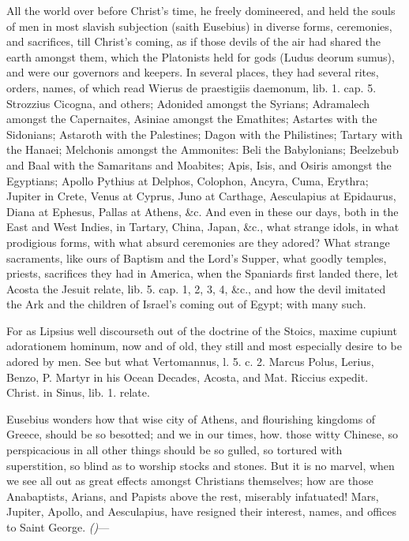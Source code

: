 {All the world over before Christ's time, he freely domineered, and held
the souls of men in most slavish subjection (saith Eusebius) in
diverse forms, ceremonies, and sacrifices, till Christ's coming, as if
those devils of the air had shared the earth amongst them, which the
Platonists held for gods (Ludus deorum sumus), and were our
governors and keepers. In several places, they had several rites,
orders, names, of which read Wierus de praestigiis daemonum, lib. 1.
cap. 5. Strozzius Cicogna, and others; Adonided amongst the
Syrians; Adramalech amongst the Capernaites, Asiniae amongst the
Emathites; Astartes with the Sidonians; Astaroth with the Palestines;
Dagon with the Philistines; Tartary with the Hanaei; Melchonis amongst
the Ammonites: Beli the Babylonians; Beelzebub and Baal with the
Samaritans and Moabites; Apis, Isis, and Osiris amongst the Egyptians;
Apollo Pythius at Delphos, Colophon, Ancyra, Cuma, Erythra; Jupiter in
Crete, Venus at Cyprus, Juno at Carthage, Aesculapius at Epidaurus,
Diana at Ephesus, Pallas at Athens, \&c. And even in these our days,
both in the East and West Indies, in Tartary, China, Japan, \&c., what
strange idols, in what prodigious forms, with what absurd ceremonies
are they adored? What strange sacraments, like ours of Baptism and the
Lord's Supper, what goodly temples, priests, sacrifices they had in
America, when the Spaniards first landed there, let Acosta the Jesuit
relate, lib. 5. cap. 1, 2, 3, 4, \&c., and how the devil imitated the
Ark and the children of Israel's coming out of Egypt; with many such.

For as Lipsius well discourseth out of the doctrine of the Stoics,
maxime cupiunt adorationem hominum, now and of old, they still and most
especially desire to be adored by men. See but what Vertomannus, l. 5.
c. 2. Marcus Polus, Lerius, Benzo, P. Martyr in his Ocean Decades,
Acosta, and Mat. Riccius expedit. Christ. in Sinus, lib. 1. relate.

Eusebius wonders how that wise city of Athens, and flourishing
kingdoms of Greece, should be so besotted; and we in our times, how.
those witty Chinese, so perspicacious in all other things should be so
gulled, so tortured with superstition, so blind as to worship stocks
and stones. But it is no marvel, when we see all out as great effects
amongst Christians themselves; how are those Anabaptists, Arians, and
Papists above the rest, miserably infatuated! Mars, Jupiter, Apollo,
and Aesculapius, have resigned their interest, names, and offices to
Saint George.
\emph{(}\emph{)}---

}
